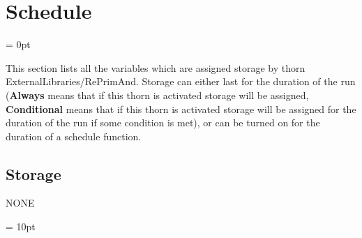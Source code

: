 
\section{Schedule} 


\parskip = 0pt


\noindent This section lists all the variables which are assigned storage by thorn ExternalLibraries/RePrimAnd.  Storage can either last for the duration of the run ({\bf Always} means that if this thorn is activated storage will be assigned, {\bf Conditional} means that if this thorn is activated storage will be assigned for the duration of the run if some condition is met), or can be turned on for the duration of a schedule function.


\subsection*{Storage}NONE

\vspace{5mm}\parskip = 10pt 
